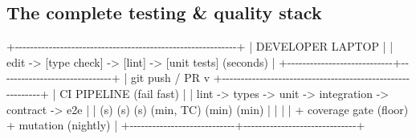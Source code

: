 \documentclass[11pt]{article}
\newenvironment{Shaded}{\begin{snugshade}}{\end{snugshade}}
\newcommand{\BuiltInTok}[1]{\textcolor[rgb]{0.50,0.55,0.55}{#1}}
\newcommand{\NormalTok}[1]{\textcolor[rgb]{0.81,0.81,0.76}{#1}}
\newcommand{\OperatorTok}[1]{\textcolor[rgb]{0.81,0.81,0.76}{#1}}
\begin{document}
\subsection{The complete testing \& quality stack}\label{the-complete-testing--quality-stack}


\begin{Shaded}
\begin{Highlighting}[]
   \OperatorTok{+{-}{-}{-}{-}{-}{-}{-}{-}{-}{-}{-}{-}{-}{-}{-}{-}{-}{-}{-}{-}{-}{-}{-}{-}{-}{-}{-}{-}{-}{-}{-}{-}{-}{-}{-}{-}{-}{-}{-}{-}{-}{-}{-}{-}{-}{-}{-}{-}{-}{-}{-}{-}{-}{-}{-}{-}{-}{-}{-}+}
   \OperatorTok{|}\NormalTok{                     DEVELOPER LAPTOP                       }\OperatorTok{|}
   \OperatorTok{|}\NormalTok{  edit }\OperatorTok{{-}\textgreater{}}\NormalTok{ [}\BuiltInTok{type}\NormalTok{ check] }\OperatorTok{{-}\textgreater{}}\NormalTok{ [lint] }\OperatorTok{{-}\textgreater{}}\NormalTok{ [unit tests] (seconds)  }\OperatorTok{|}
   \OperatorTok{+{-}{-}{-}{-}{-}{-}{-}{-}{-}{-}{-}{-}{-}{-}{-}{-}{-}{-}{-}{-}{-}{-}{-}{-}{-}{-}{-}{-}+{-}{-}{-}{-}{-}{-}{-}{-}{-}{-}{-}{-}{-}{-}{-}{-}{-}{-}{-}{-}{-}{-}{-}{-}{-}{-}{-}{-}{-}{-}+}
                                \OperatorTok{|}\NormalTok{ git push }\OperatorTok{/}\NormalTok{ PR}
\NormalTok{                                v}
   \OperatorTok{+{-}{-}{-}{-}{-}{-}{-}{-}{-}{-}{-}{-}{-}{-}{-}{-}{-}{-}{-}{-}{-}{-}{-}{-}{-}{-}{-}{-}{-}{-}{-}{-}{-}{-}{-}{-}{-}{-}{-}{-}{-}{-}{-}{-}{-}{-}{-}{-}{-}{-}{-}{-}{-}{-}{-}{-}{-}{-}{-}+}
   \OperatorTok{|}\NormalTok{                      CI PIPELINE (fail fast)               }\OperatorTok{|}
   \OperatorTok{|}\NormalTok{  lint }\OperatorTok{{-}\textgreater{}}\NormalTok{ types }\OperatorTok{{-}\textgreater{}}\NormalTok{ unit }\OperatorTok{{-}\textgreater{}}\NormalTok{ integration }\OperatorTok{{-}\textgreater{}}\NormalTok{ contract }\OperatorTok{{-}\textgreater{}}\NormalTok{ e2e   }\OperatorTok{|}
   \OperatorTok{|}\NormalTok{   (s)     (s)     (s)      (}\BuiltInTok{min}\NormalTok{, TC)      (}\BuiltInTok{min}\NormalTok{)     (}\BuiltInTok{min}\NormalTok{)   }\OperatorTok{|}
   \OperatorTok{|}                                                            \OperatorTok{|}
   \OperatorTok{|}  \OperatorTok{+}\NormalTok{ coverage gate (floor)   }\OperatorTok{+}\NormalTok{ mutation (nightly)            }\OperatorTok{|}
   \OperatorTok{+{-}{-}{-}{-}{-}{-}{-}{-}{-}{-}{-}{-}{-}{-}{-}{-}{-}{-}{-}{-}{-}{-}{-}{-}{-}{-}{-}{-}+{-}{-}{-}{-}{-}{-}{-}{-}{-}{-}{-}{-}{-}{-}{-}{-}{-}{-}{-}{-}{-}{-}{-}{-}{-}{-}{-}{-}{-}{-}+}

\end{Highlighting}
\end{Shaded}
\end{document}
